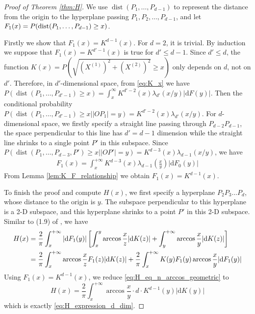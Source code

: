 \documentclass{aptpub}
\DeclareMathOperator{\dist}{dist}
\def\d{\mathrm{d}}
\begin{document}
\begin{proof}[Proof of Theorem \ref{thm:H}]
     
We use $\dist(P_1,\dots, P_{d-1})$ to represent
the distance from the origin to the hyperplane passing $P_1,P_2,\dots, P_{d-1}$,
and let $F_1(x)=P(\dist(P_1,\dots, P_{d-1})\linebreak\geq x)$.


Firstly we show that $F_1(x)=K^{d-1}(x)$.
For $d=2$, it is trivial.
By induction we suppose that $F_1(x)=K^{d'-1}(x)$ is true for
$d'\leq d-1$.
Since $d'\leq d$,
the function $K(x)=P(\sqrt{(X^{(1)})^2 + (X^{(2)})^2} \geq x)$
only depends on $d$,
not on $d'$.
Therefore, in $d'$-dimensional space,
from \eqref{eq:K_x} we have $
P(\dist(P_1, \dots, P_{d'-1})\geq x) = \int_{x}^{\infty} K^{d'-2}(x)\lambda_{d'}(x/y)|\d F(y)|
$.
Then the conditional probability $P(\dist(P_1,\dots, P_{d'-1})\geq x \Big\vert |OP_1|=y)
=K^{d'-2}(x)\lambda_{d'}(x/y)$.
For $d$-dimensional space, 
we firstly specify a straight line passing through $P_{d-2}P_{d-1}$,
the space perpendicular 
to this line has $d'=d-1$ dimension while the straight line shrinks to a single point $P'$
in this subspace. Since
$P(\dist(P_1,\dots,P_{d-3},P')\geq x \Big\vert |OP'|=y)=
K^{d-3}(x)\lambda_{d-1}(x/y)$,
we have
\begin{align*}
    F_1(x) = \int_x^{+\infty} K^{d-3}(x) \lambda_{d-1}(\frac{x}{y})|\d F_0(y)|
\end{align*}
From Lemma \ref{lem:K_F_relationship} we obtain $F_1(x) = K^{d-1}(x)$.

To finish the proof and compute $H(x)$, we first specify a hyperplane $P_2P_3\dots P_{d}$,
whose distance to the origin is $y$. The subspace perpendicular to this hyperplane is a 2-D subspace,
and this hyperplane shrinks to a point $P'$ in this 2-D subspace.
Similar to (1.9) of \cite{carnal1970konvexe}, we have
\begin{align}\label{eq:H_eq_n_arccos_geometric}
     H(x) &= \frac{2}{\pi}\int_x^{+\infty}|\d F_1(y)|
     \left[ \int_x^y \arccos\frac{x}{z}|\d K(z)|
     +\int_y^{+\infty}\arccos\frac{x}{y} |\d K(z)|\right]\\
     &=\frac{2}{\pi}\int_x^{+\infty} \arccos\frac{x}{z}
     F_1(z)|\d K(z)|+\frac{2}{\pi}\int_{x}^{+\infty} K(y)F_1(y)\arccos\frac{x}{y}|\d F_1(y)| \notag 
 \end{align}
Using $F_1(x)=K^{d-1}(x)$,
we reduce \eqref{eq:H_eq_n_arccos_geometric} to
 $$
 H(x) = \frac{2}{\pi}\int_x^{+\infty}  \arccos\frac{x}{y}\cdot
 d\cdot  K^{d-1}(y) |\d K(y)|
 $$
 which is exactly \eqref{eq:H_expression_d_dim}.
 
\end{proof}
\end{document}
